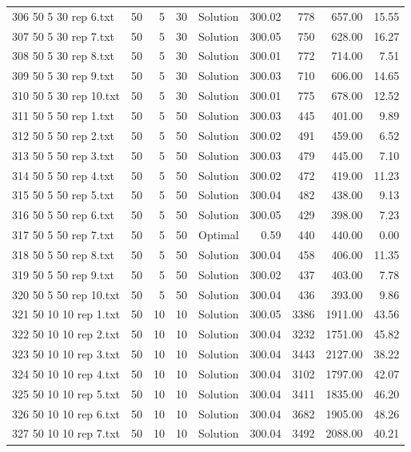 \begin{longtable}{lrrllrrrr}
306 50 5 30 rep 6.txt & 50 & 5 & 30 & Solution & 300.02 & 778 & 657.00 & 15.55\\
307 50 5 30 rep 7.txt & 50 & 5 & 30 & Solution & 300.05 & 750 & 628.00 & 16.27\\
308 50 5 30 rep 8.txt & 50 & 5 & 30 & Solution & 300.01 & 772 & 714.00 &  7.51\\
309 50 5 30 rep 9.txt & 50 & 5 & 30 & Solution & 300.03 & 710 & 606.00 & 14.65\\
310 50 5 30 rep 10.txt & 50 & 5 & 30 & Solution & 300.01 & 775 & 678.00 & 12.52\\
311 50 5 50 rep 1.txt & 50 & 5 & 50 & Solution & 300.03 & 445 & 401.00 &  9.89\\
312 50 5 50 rep 2.txt & 50 & 5 & 50 & Solution & 300.02 & 491 & 459.00 &  6.52\\
313 50 5 50 rep 3.txt & 50 & 5 & 50 & Solution & 300.03 & 479 & 445.00 &  7.10\\
314 50 5 50 rep 4.txt & 50 & 5 & 50 & Solution & 300.02 & 472 & 419.00 & 11.23\\
315 50 5 50 rep 5.txt & 50 & 5 & 50 & Solution & 300.04 & 482 & 438.00 &  9.13\\
316 50 5 50 rep 6.txt & 50 & 5 & 50 & Solution & 300.05 & 429 & 398.00 &  7.23\\
317 50 5 50 rep 7.txt & 50 & 5 & 50 & Optimal &  0.59 & 440 & 440.00 &  0.00\\
318 50 5 50 rep 8.txt & 50 & 5 & 50 & Solution & 300.04 & 458 & 406.00 & 11.35\\
319 50 5 50 rep 9.txt & 50 & 5 & 50 & Solution & 300.02 & 437 & 403.00 &  7.78\\
320 50 5 50 rep 10.txt & 50 & 5 & 50 & Solution & 300.04 & 436 & 393.00 &  9.86\\
321 50 10 10 rep 1.txt & 50 & 10 & 10 & Solution & 300.05 & 3386 & 1911.00 & 43.56\\
322 50 10 10 rep 2.txt & 50 & 10 & 10 & Solution & 300.04 & 3232 & 1751.00 & 45.82\\
323 50 10 10 rep 3.txt & 50 & 10 & 10 & Solution & 300.04 & 3443 & 2127.00 & 38.22\\
324 50 10 10 rep 4.txt & 50 & 10 & 10 & Solution & 300.04 & 3102 & 1797.00 & 42.07\\
325 50 10 10 rep 5.txt & 50 & 10 & 10 & Solution & 300.04 & 3411 & 1835.00 & 46.20\\
326 50 10 10 rep 6.txt & 50 & 10 & 10 & Solution & 300.04 & 3682 & 1905.00 & 48.26\\
327 50 10 10 rep 7.txt & 50 & 10 & 10 & Solution & 300.04 & 3492 & 2088.00 & 40.21\\

\end{longtable}
